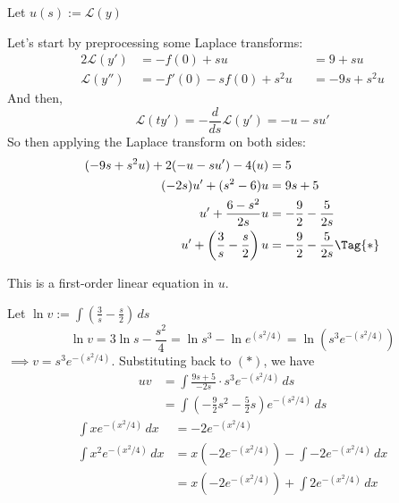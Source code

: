 \begin{compute}
  \def\L{\mathcal L}

  Let $u(s):=\L(y)$

  Let's start by preprocessing some Laplace transforms:
  \begin{alignat*}{2}
    \L(y')  & =-f(0)+su          &  & = 9+su     \\
    \L(y'') & =-f'(0)-sf(0)+s^2u &  & = -9s+s^2u
  \end{alignat*}
  And then,
  $$
    \L(ty')=-\frac{d}{ds}\L(y')=-u-su'
  $$
  So then applying the Laplace transform on both sides:
  \begin{align*}
    (-9s+s^2u)+2(-u-su')-4(u)         &=5                          \\
    (-2s)u'+(s^2-6)u                  &=9s+5                       \\
    u'+\frac{6-s^2}{2s}u              &=-\frac92-\frac5{2s}        \\
    u'+\left(\frac3s-\frac s2\right)u &=-\frac92-\frac5{2s}\Tag{*}
  \end{align*}

  This is a first-order linear equation in $u$.

  Let $\displaystyle\ln v:=\int\left(\frac3s-\frac s2\right)\,ds$
  $$
    \ln v = 3\ln s-\frac{s^2}4
    = \ln s^3-\ln e^{(s^2/4)}
    = \ln (s^3e^{-(s^2/4)})
  $$
  $\implies v=s^3e^{-(s^2/4)}$. Substituting back to $(*)$, we have
  \begin{align*}
    uv &=\int\frac{9s+5}{-2s}\cdot s^3e^{-(s^2/4)}\,ds           \\
       &=\int\left(-\frac92s^2-\frac5{2}s\right)e^{-(s^2/4)}\,ds
  \end{align*}
  \begin{align*}
    \int xe^{-(x^2/4)}\,dx   &= -2e^{-(x^2/4)}                           \\
    \int x^2e^{-(x^2/4)}\,dx &= x(-2e^{-(x^2/4)})-\int-2e^{-(x^2/4)}\,dx \\
                             &= x(-2e^{-(x^2/4)})+\int2e^{-(x^2/4)}\,dx  \\
  \end{align*}

\end{compute}
